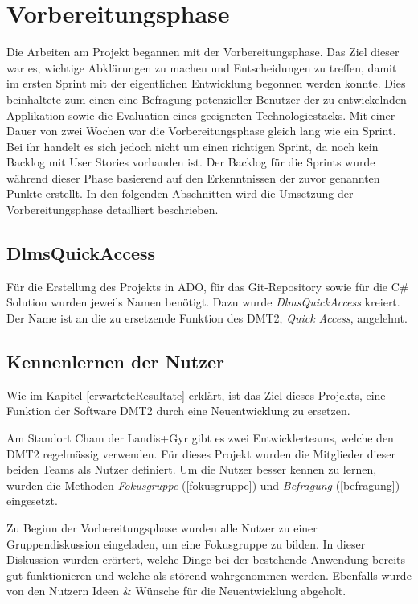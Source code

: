 \section{Vorbereitungsphase}
Die Arbeiten am Projekt begannen mit der Vorbereitungsphase. Das Ziel dieser war es, wichtige Abklärungen zu machen und Entscheidungen zu treffen, damit im ersten Sprint mit der eigentlichen Entwicklung begonnen werden konnte.
Dies beinhaltete zum einen eine Befragung potenzieller Benutzer der zu entwickelnden Applikation sowie die Evaluation eines geeigneten Technologiestacks.
Mit einer Dauer von zwei Wochen war die Vorbereitungsphase gleich lang wie ein Sprint.
Bei ihr handelt es sich jedoch nicht um einen richtigen Sprint, da noch kein Backlog mit User Stories vorhanden ist.
Der Backlog für die Sprints wurde während dieser Phase basierend auf den Erkenntnissen der zuvor genannten Punkte erstellt.
In den folgenden Abschnitten wird die Umsetzung der Vorbereitungsphase detailliert beschrieben.

\subsection{DlmsQuickAccess}
Für die Erstellung des Projekts in \ac{ADO}, für das Git-Repository sowie für die C\# Solution wurden jeweils Namen benötigt.
Dazu wurde \textit{DlmsQuickAccess} kreiert.
Der Name ist an die zu ersetzende Funktion des \ac{DMT2}, \textit{Quick Access}, angelehnt.

\subsection{Kennenlernen der Nutzer}\label{survey}
Wie im Kapitel \ref{erwarteteResultate} erklärt, ist das Ziel dieses Projekts, eine Funktion der Software \ac{DMT2} durch eine Neuentwicklung zu ersetzen.

Am Standort Cham der Landis+Gyr gibt es zwei Entwicklerteams, welche den \ac{DMT2} regelmässig verwenden.
Für dieses Projekt wurden die Mitglieder dieser beiden Teams als Nutzer definiert.
Um die Nutzer besser kennen zu lernen, wurden die Methoden \textit{Fokusgruppe} (\ref{fokusgruppe}) und \textit{Befragung} (\ref{befragung}) eingesetzt.

Zu Beginn der Vorbereitungsphase wurden alle Nutzer zu einer Gruppendiskussion eingeladen, um eine Fokusgruppe zu bilden.
In dieser Diskussion wurden erörtert, welche Dinge bei der bestehende Anwendung bereits gut funktionieren und welche als störend wahrgenommen werden.
Ebenfalls wurde von den Nutzern Ideen \& Wünsche für die Neuentwicklung abgeholt.

